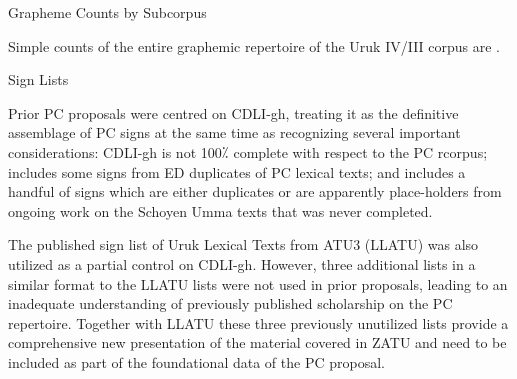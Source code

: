 	\centerline{\vbox{\offinterlineskip{}
}}\Hhhh{}Grapheme Counts by Subcorpus


\par Simple counts of the entire graphemic repertoire of the Uruk
      IV/III corpus are .

\Hh{}Sign Lists


\par Prior PC proposals were centred on CDLI-gh, treating it as
      the definitive assemblage of PC signs at the same time as
      recognizing several important considerations: CDLI-gh is not
      100⁒ complete with respect to the PC rcorpus; includes some
      signs from ED duplicates of PC lexical texts; and includes a
      handful of signs which are either duplicates or are apparently
      place-holders from ongoing work on the Schoyen Umma texts that
      was never completed.


\par The published sign list of Uruk Lexical Texts from ATU3
      (LLATU) was also utilized as a partial control on
      CDLI-gh. However, three additional lists in a similar format to
      the LLATU lists were not used in prior proposals, leading to an
      inadequate understanding of previously published scholarship on
      the PC repertoire.  Together with LLATU these three previously
      unutilized lists provide a comprehensive new presentation of the
      material covered in ZATU and need to be included as part of the
      foundational data of the PC proposal.


